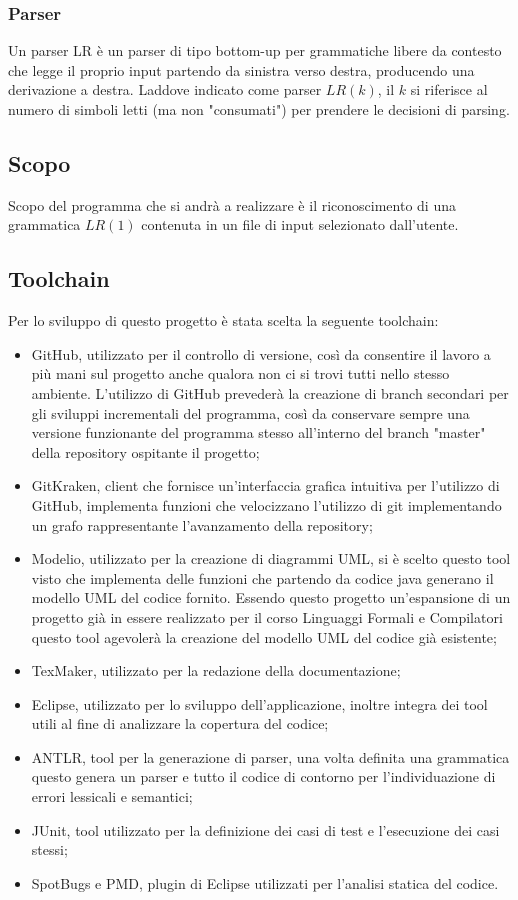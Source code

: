 \documentclass[12pt]{article}
\begin{document}
\subsubsection*{Parser}
Un parser LR è un parser di tipo bottom-up per grammatiche libere da contesto che legge il proprio input partendo da sinistra verso destra, producendo una derivazione a destra. Laddove indicato come parser $LR \left( k \right)$, il $k$ si riferisce al numero di simboli letti (ma non "consumati") per prendere le decisioni di parsing.

\subsection{Scopo}
Scopo del programma che si andrà a realizzare è il riconoscimento di una grammatica $LR \left( 1 \right)$ contenuta in un file di input selezionato dall'utente. \par

\pagebreak

\subsection{Toolchain}
Per lo sviluppo di questo progetto è stata scelta la seguente toolchain:
\begin{itemize}
\item GitHub, utilizzato per il controllo di versione, così da consentire il lavoro a più mani sul progetto anche qualora non ci si trovi tutti nello stesso ambiente. L'utilizzo di GitHub prevederà la creazione di branch secondari per gli sviluppi incrementali del programma, così da conservare sempre una versione funzionante del programma stesso all'interno del branch "master" della repository ospitante il progetto;
\item GitKraken, client che fornisce un'interfaccia grafica intuitiva per l'utilizzo di GitHub, implementa funzioni che velocizzano l'utilizzo di git implementando un grafo rappresentante l'avanzamento della repository;
\item Modelio, utilizzato per la creazione di diagrammi UML, si è scelto questo tool visto che implementa delle funzioni che partendo da codice java generano il modello UML del codice fornito. Essendo questo progetto un'espansione di un progetto già in essere realizzato per il corso Linguaggi Formali e Compilatori questo tool agevolerà la creazione del modello UML del codice già esistente;
\item TexMaker, utilizzato per la redazione della documentazione;
\item Eclipse, utilizzato per lo sviluppo dell'applicazione, inoltre integra dei tool utili al fine di analizzare la copertura del codice;
\item ANTLR, tool per la generazione di parser, una volta definita una grammatica questo genera un parser e tutto il codice di contorno per l'individuazione di errori lessicali e semantici;
\item JUnit, tool utilizzato per la definizione dei casi di test e l'esecuzione dei casi stessi;
\item SpotBugs e PMD, plugin di Eclipse utilizzati per l'analisi statica del codice.
\end{itemize}
\end{document}
